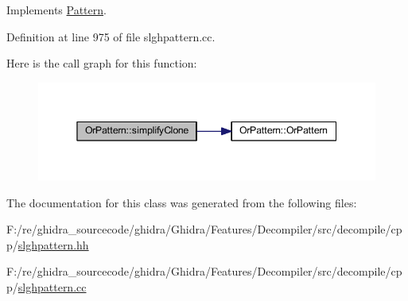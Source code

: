 Implements \mbox{\hyperlink{class_pattern_a9c2c1383d7f836f8af237a03e463d94d}{Pattern}}.



Definition at line 975 of file slghpattern.\+cc.

Here is the call graph for this function\+:
\nopagebreak
\begin{figure}[H]
\begin{center}
\leavevmode
\includegraphics[width=345pt]{class_or_pattern_ae6db76f35f6dc8661a511c9db40ecfd7_cgraph}
\end{center}
\end{figure}


The documentation for this class was generated from the following files\+:\begin{DoxyCompactItemize}
\item 
F\+:/re/ghidra\+\_\+sourcecode/ghidra/\+Ghidra/\+Features/\+Decompiler/src/decompile/cpp/\mbox{\hyperlink{slghpattern_8hh}{slghpattern.\+hh}}\item 
F\+:/re/ghidra\+\_\+sourcecode/ghidra/\+Ghidra/\+Features/\+Decompiler/src/decompile/cpp/\mbox{\hyperlink{slghpattern_8cc}{slghpattern.\+cc}}\end{DoxyCompactItemize}
